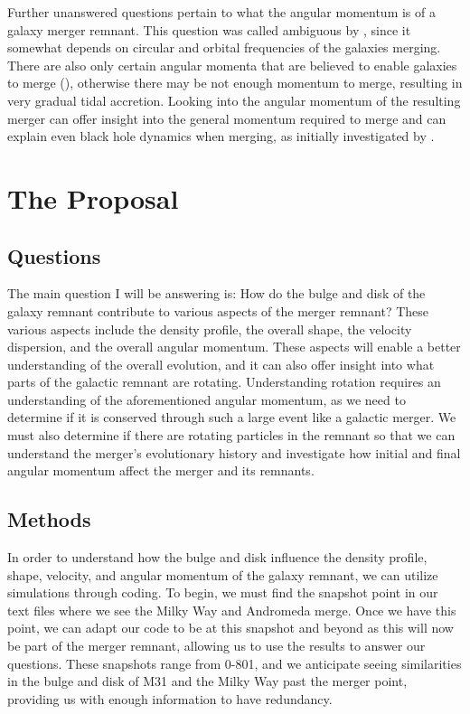 \documentclass[twocolumn]{aastex631}
\begin{document}
Further unanswered questions pertain to what the angular momentum is of a galaxy merger remnant. This question was called ambiguous by \cite{2008ApJS..175..356H}, since it somewhat depends on circular and orbital frequencies of the galaxies merging. There are also only certain angular momenta that are believed to enable galaxies to merge (\cite{2008ApJS..175..356H}), otherwise there may be not enough momentum to merge, resulting in very gradual tidal accretion. Looking into the angular momentum of the resulting merger can offer insight into the general momentum required to merge and can explain even black hole dynamics when merging, as initially investigated by \cite{2008ApJS..175..356H}. 


\section{The Proposal} \label{sec:style}

\subsection{Questions}
The main question I will be answering is: How do the bulge and disk of the galaxy remnant contribute to various aspects of the merger remnant? These various aspects include the density profile, the overall shape, the velocity dispersion, and the overall angular momentum. These aspects will enable a better understanding of the overall evolution, and it can also offer insight into what parts of the galactic remnant are rotating. Understanding rotation requires an understanding of the aforementioned angular momentum, as we need to determine if it is conserved through such a large event like a galactic merger. We must also determine if there are rotating particles in the remnant so that we can understand the merger's evolutionary history and investigate how initial and final angular momentum affect the merger and its remnants. 

\subsection{Methods}
In order to understand how the bulge and disk influence the density profile, shape, velocity, and angular momentum of the galaxy remnant, we can utilize simulations through coding. To begin, we must find the snapshot point in our text files where we see the Milky Way and Andromeda merge. Once we have this point, we can adapt our code to be at this snapshot and beyond as this will now be part of the merger remnant, allowing us to use the results to answer our questions. These snapshots range from 0-801, and we anticipate seeing similarities in the bulge and disk of M31 and the Milky Way past the merger point, providing us with enough information to have redundancy. 
\end{document}
